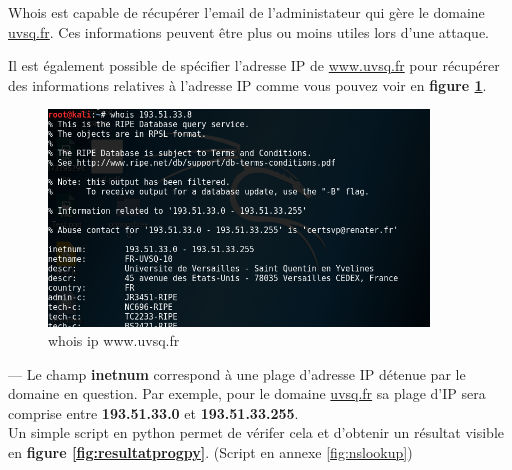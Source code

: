  Whois est capable de récupérer l'email de l'administateur qui gère le domaine \url{uvsq.fr}. Ces informations peuvent être plus ou moins utiles lors d'une attaque.

Il est également possible de spécifier l'adresse IP de \url{www.uvsq.fr} pour récupérer des informations relatives à l'adresse IP comme vous pouvez voir en \textbf{figure \ref{fig:whoisip}}.

\begin{figure}[b!]
  \centering
  \setlength\figureheight{7cm}
  \setlength\figurewidth{9cm}
  \includegraphics[width=0.9\textwidth]{oui/images/Whois/whois4.PNG}
  \caption{whois ip www.uvsq.fr}
  \label{fig:whoisip}
\end{figure}
 --- Le champ \textbf{inetnum} correspond à une plage d'adresse IP détenue par le domaine en question. Par exemple, pour le domaine \url{uvsq.fr} sa plage d'IP sera comprise entre \textbf{193.51.33.0} et \textbf{193.51.33.255}.\\

Un simple script en python permet de vérifer cela et d'obtenir un résultat visible en \textbf{figure \ref{fig:resultatprogpy}}.  (Script en annexe \ref{fig:nslookup})

